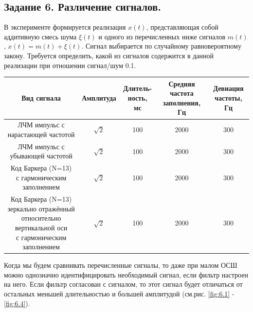\subsection{Задание 6. Различение сигналов.}


В эксперименте формируется реализация $x(t)$, представляющая собой
аддитивную смесь шума $\xi(t)$ и одного из перечисленных ниже сигналов $m(t)$,
$x(t)=m(t)+ \xi(t)$. Сигнал выбирается по случайному равновероятному закону.
Требуется определить, какой из сигналов содержится в данной реализации при
отношении сигнал/шум 0.1.

\begin{table}[H]
    \centering
    \small
    \begin{tabular}{|c|c|c|c|c|}
    \hline
    Вид сигнала & Амплитуда & \makecell{Длитель- \\ность, мс} & \makecell{Средняя частота \\
    заполнения, Гц} &
    \makecell{Девиация \\                        частоты, Гц} \\
    \hline 
    \makecell{ ЛЧМ импульс с \\ нарастающей частотой} & $\sqrt 2$& 100 & 2000 & 300 \\
    \hline 
\makecell{ ЛЧМ импульс с \\ убывающей частотой} & $\sqrt 2$& 100 & 2000 & 300 \\
    \hline 
\makecell{Код Баркера (N=13) \\ с гармоническим заполнением } & $\sqrt 2$& 100 & 2000 & 300 \\
    \hline 
    \makecell {Код Баркера (N=13)  \\ зеркально
отражённый  \\
относительно \\ 
вертикальной оси\\ с гармоническим заполнением} & $\sqrt 2$& 100 & 2000 & 300 \\
    \hline
    \end{tabular}
\end{table}


Когда мы будем сравнивать перечисленные сигналы, то даже при малом ОСШ
можно однозначно идентифицировать необходимый сигнал, если фильтр настроен на
него. Если фильтр согласован с сигналом, то этот сигнал будет отличаться от
остальных  меньшей длительностью и большей
амплитудой (см.рис. \ref{fig:6.1} - \ref{fig:6.4}). 



